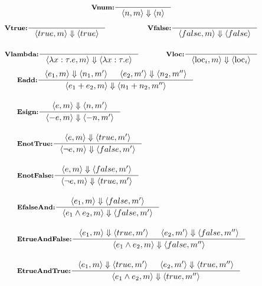 \documentclass[12pt]{article}
\newcommand{\spacing}{1em}
\begin{document}
\begin{align*}
\inference[\textbf{Vnum:}]{}{
    \langle n, m \rangle \Downarrow \langle n \rangle
}
\end{align*}
\begin{align*}
&\inference[\textbf{Vtrue:}]{}{
    \langle true, m \rangle \Downarrow \langle true \rangle
}
&\inference[\textbf{Vfalse:}]{}{
    \langle false, m \rangle \Downarrow \langle false \rangle
}
\\[\spacing]
&\inference[\textbf{Vlambda:}]{}{
    \langle \lambda x : \tau . e, m \rangle \Downarrow \langle \lambda x : \tau . e \rangle
}
&\inference[\textbf{Vloc:}]{}{
    \langle \textrm{loc}_i, m \rangle \Downarrow \langle \textrm{loc}_i \rangle
}
\end{align*}
\vspace{2em}
\begin{align}
&\inference[\textbf{Eadd:}]{
    \langle e_1, m \rangle \Downarrow \langle n_1, m' \rangle &&
    \langle e_2, m' \rangle \Downarrow \langle n_2, m'' \rangle
}{
    \langle e_1 + e_2, m \rangle \Downarrow \langle n_1 + n_2, m'' \rangle
}
\\[\spacing]
&\inference[\textbf{Esign:}]{
    \langle e, m \rangle \Downarrow \langle n, m' \rangle
}{
    \langle -e, m \rangle \Downarrow \langle -n, m' \rangle
}
\\[\spacing]
&\inference[\textbf{EnotTrue:}]{
    \langle e, m \rangle \Downarrow \langle true, m' \rangle
}{
    \langle \neg e, m \rangle \Downarrow \langle false, m'  \rangle
}
\\[\spacing]
&\inference[\textbf{EnotFalse:}]{
    \langle e, m \rangle \Downarrow \langle false, m' \rangle
}{
    \langle \neg e, m \rangle \Downarrow \langle true, m'  \rangle
}
\\[\spacing]
&\inference[\textbf{EfalseAnd:}]{
    \langle e_1, m \rangle \Downarrow \langle false, m' \rangle
}{
    \langle e_1 \wedge e_2, m \rangle \Downarrow \langle false, m'  \rangle
}
\\[\spacing]
&\inference[\textbf{EtrueAndFalse:}]{
    \langle e_1, m \rangle \Downarrow \langle true, m' \rangle &
    \langle e_2, m' \rangle \Downarrow \langle false, m'' \rangle
}{
    \langle e_1 \wedge e_2, m \rangle \Downarrow \langle false, m''  \rangle
}
\\[\spacing]
&\inference[\textbf{EtrueAndTrue:}]{
    \langle e_1, m \rangle \Downarrow \langle true, m' \rangle &
    \langle e_2, m' \rangle \Downarrow \langle true, m'' \rangle
}{
    \langle e_1 \wedge e_2, m \rangle \Downarrow \langle true, m''  \rangle
}
\end{align}
\end{document}
